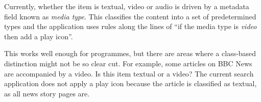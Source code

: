 Currently, whether the item is textual, video or audio is driven by
a metadata field known as \emph{media type}. This classifies the content
into a set of predetermined types and the application uses rules
along the lines of ``if the media type is \emph{video} then add a play icon''.

This works well enough for programmes, but there are areas where
a class-based distinction might not be so clear cut. For example, some articles
on BBC News are accompanied by a video. Is this item textual or a video?
The current search application does not apply a play icon because the
article is classified as textual, as all news story pages are.
